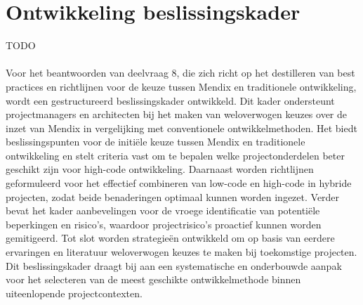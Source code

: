 \section{Ontwikkeling beslissingskader}
TODO
\\
\\
Voor het beantwoorden van deelvraag 8, die zich richt op het destilleren van best practices en richtlijnen voor de keuze tussen Mendix en traditionele ontwikkeling, wordt een gestructureerd beslissingskader ontwikkeld. Dit kader ondersteunt projectmanagers en architecten bij het maken van weloverwogen keuzes over de inzet van Mendix in vergelijking met conventionele ontwikkelmethoden. Het biedt beslissingspunten voor de initiële keuze tussen Mendix en traditionele ontwikkeling en stelt criteria vast om te bepalen welke projectonderdelen beter geschikt zijn voor high-code ontwikkeling. Daarnaast worden richtlijnen geformuleerd voor het effectief combineren van low-code en high-code in hybride projecten, zodat beide benaderingen optimaal kunnen worden ingezet. Verder bevat het kader aanbevelingen voor de vroege identificatie van potentiële beperkingen en risico’s, waardoor projectrisico’s proactief kunnen worden gemitigeerd. Tot slot worden strategieën ontwikkeld om op basis van eerdere ervaringen en literatuur weloverwogen keuzes te maken bij toekomstige projecten. Dit beslissingskader draagt bij aan een systematische en onderbouwde aanpak voor het selecteren van de meest geschikte ontwikkelmethode binnen uiteenlopende projectcontexten.


